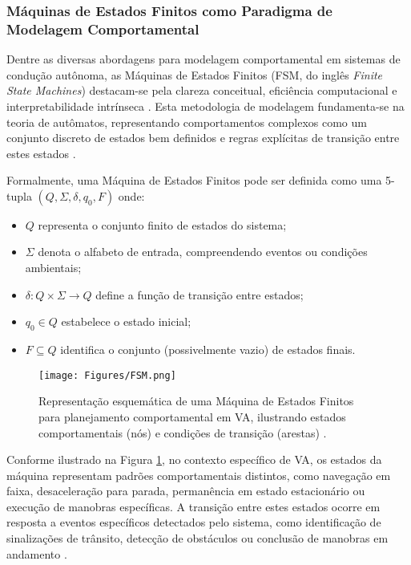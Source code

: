\subsubsection{Máquinas de Estados Finitos como Paradigma de Modelagem Comportamental} \label{subsubsec:FSM}

Dentre as diversas abordagens para modelagem comportamental em sistemas de condução autônoma, as Máquinas de Estados Finitos (FSM, do inglês \textit{Finite State Machines}) destacam-se pela clareza conceitual, eficiência computacional e interpretabilidade intrínseca \cite{wei2014behavioral}. Esta metodologia de modelagem fundamenta-se na teoria de autômatos, representando comportamentos complexos como um conjunto discreto de estados bem definidos e regras explícitas de transição entre estes estados \cite{lavalle2006planning}.

Formalmente, uma Máquina de Estados Finitos pode ser definida como uma 5-tupla $(Q, \Sigma, \delta, q_0, F)$ onde:

\begin{itemize}
    \item $Q$ representa o conjunto finito de estados do sistema;
    \item $\Sigma$ denota o alfabeto de entrada, compreendendo eventos ou condições ambientais;
    \item $\delta: Q \times \Sigma \rightarrow Q$ define a função de transição entre estados;
    \item $q_0 \in Q$ estabelece o estado inicial;
    \item $F \subseteq Q$ identifica o conjunto (possivelmente vazio) de estados finais.
\end{itemize}

\begin{figure}[H]
\centering
\texttt{[image: Figures/FSM.png]}
\caption{Representação esquemática de uma Máquina de Estados Finitos para planejamento comportamental em VA, ilustrando estados comportamentais (nós) e condições de transição (arestas) \cite[Module 2 - Lesson 4: Hierarchical Motion Planning. ~7min54s]{University_of_Toronto2018-mp}.}
\label{FSM}
\end{figure}

Conforme ilustrado na Figura \ref{FSM}, no contexto específico de VA, os estados da máquina representam padrões comportamentais distintos, como navegação em faixa, desaceleração para parada, permanência em estado estacionário ou execução de manobras específicas. A transição entre estes estados ocorre em resposta a eventos específicos detectados pelo sistema, como identificação de sinalizações de trânsito, detecção de obstáculos ou conclusão de manobras em andamento \cite{University_of_Toronto2018-mp}.

